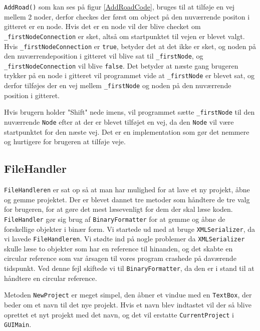 \texttt{AddRoad()} som kan ses på figur \ref{AddRoadCode}, bruges til at tilføje en vej mellem 2 noder, derfor checkes der først om object på den nuværrende positon i gitteret er en node. Hvis det er en node vil der blive checket om \texttt{\_firstNodeConnection} er sket, altså om startpunktet til vejen er blevet valgt. Hvis \texttt{\_firstNodeConnection} er \texttt{true}, betyder det at det ikke er sket, og noden på den nuværrendeposition i gitteret vil blive sat til \texttt{\_firstNode}, og \texttt{\_firstNodeConnection} vil blive \texttt{false}. Det betyder at næste gang brugeren trykker på en node i gitteret vil programmet vide at \texttt{\_firstNode} er blevet sat, og derfor tilføjes der en vej mellem \texttt{\_firstNode} og noden på den nuværrende position i gitteret.

\vspace{5mm}

Hvis brugern holder "Shift" nede imens, vil programmet sætte \texttt{\_firstNode} til den nuværrende \texttt{Node} efter at der er blevet tilføjet en vej, da den \texttt{Node} vil være startpunktet for den næste vej. Det er en implementation som gør det nemmere og hurtigere for brugeren at tilføje veje. 

\subsection*{FileHandler}
\texttt{FileHandleren} er sat op så at man har mulighed for at lave et ny projekt, åbne og gemme projektet. Der er blevet dannet tre metoder som håndtere de tre valg for brugeren, for at gøre det mest læsevenligt for dem der skal læse koden. \texttt{FileHandler} gør sig brug af \texttt{BinaryFormatter} for at gemme og åbne de forskellige objekter i binær form. Vi startede ud med at bruge \texttt{XMLSerializer}, da vi lavede \texttt{FileHandleren}. Vi stødte ind på nogle problemer da \texttt{XMLSerializer} skulle læse to objekter som har en reference til hinanden, og det skabte en circular reference som var årsagen til vores program crashede på daværende tidspunkt. Ved denne fejl skiftede vi til \texttt{BinaryFormatter}, da den er i stand til at håndtere en circular reference.

\vspace{5mm}

Metoden \texttt{NewProject} er meget simpel, den åbner et vindue med en \texttt{TextBox}, der beder om et navn til det nye projekt. Hvis et navn blev indtastet vil der så blive oprettet et nyt projekt med det navn, og det vil erstatte \texttt{CurrentProject} i \texttt{GUIMain}.

